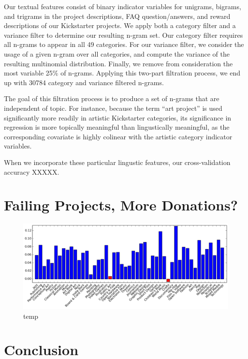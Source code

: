 \documentclass[letterpaper]{article}
\begin{document}
Our textual features consist of binary indicator variables for unigrams, bigrams, and trigrams in the project descriptions, FAQ question/answers, and reward descriptions of our Kickstarter projects. We apply both a category filter and a variance filter to determine our resulting n-gram set. Our category filter requires all n-grams to appear in all 49 categories. For our variance filter, we consider the usage of a given n-gram over all categories, and compute the variance of the resulting multinomial distribution. Finally, we remove from consideration the most variable 25\% of n-grams. Applying this two-part filtration process, we end up with 30784 category and variance filtered n-grams.

The goal of this filtration process is to produce a set of n-grams that are independent of topic. For instance, because the term ``art project'' is used significantly more readily in artistic Kickstarter categories, its significance in regression is more topically meaningful than lingustically meaningful, as the corresponding covariate is highly colinear with the artistic category indicator variables.

When we incorporate these particular lingustic features, our cross-validation accuracy XXXXX.

\section{Failing Projects, More Donations?}

\begin{figure}
\centering
\includegraphics[width=.9\textwidth]{figures/failSuccess.png}                         
\caption{temp}
\label{fig:succfail}
\end{figure}

\section{Conclusion}

 
\end{document}
